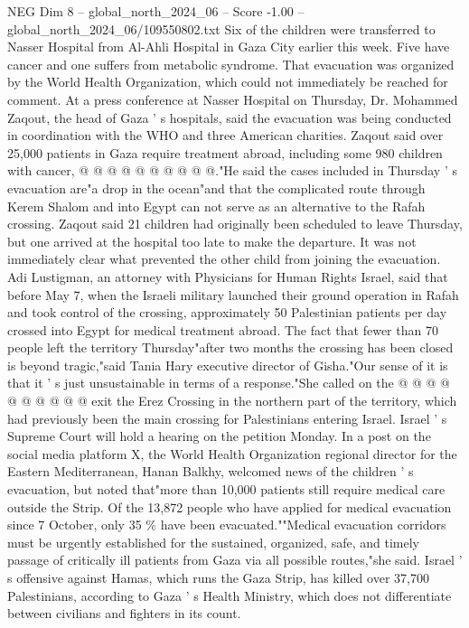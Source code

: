 \begin{textsample}{NEG Dim 8 – global\_north\_2024\_06 – Score -1.00 – global\_north\_2024\_06/109550802.txt}
Six of the children were transferred to Nasser Hospital from Al-Ahli Hospital in Gaza City earlier this week.
Five have cancer and one suffers from metabolic syndrome.
That evacuation was organized by the World Health Organization, which could not immediately be reached for comment.
At a press conference at Nasser Hospital on Thursday, Dr.
Mohammed Zaqout, the head of Gaza ' s hospitals, said the evacuation was being conducted in coordination with the WHO and three American charities.
Zaqout said over 25,000 patients in Gaza require treatment abroad, including some 980 children with cancer, @ @ @ @ @ @ @ @ @ @."He said the cases included in Thursday ' s evacuation are"a drop in the ocean"and that the complicated route through Kerem Shalom and into Egypt can not serve as an alternative to the Rafah crossing.
Zaqout said 21 children had originally been scheduled to leave Thursday, but one arrived at the hospital too late to make the departure.
It was not immediately clear what prevented the other child from joining the evacuation.
Adi Lustigman, an attorney with Physicians for Human Rights Israel, said that before May 7, when the Israeli military launched their ground operation in Rafah and took control of the crossing, approximately 50 Palestinian patients per day crossed into Egypt for medical treatment abroad.
The fact that fewer than 70 people left the territory Thursday"after two months the crossing has been closed is beyond tragic,"said Tania Hary executive director of Gisha."Our sense of it is that it ' s just unsustainable in terms of a response."She called on the @ @ @ @ @ @ @ @ @ @ exit the Erez Crossing in the northern part of the territory, which had previously been the main crossing for Palestinians entering Israel.
Israel ' s Supreme Court will hold a hearing on the petition Monday.
In a post on the social media platform X, the World Health Organization regional director for the Eastern Mediterranean, Hanan Balkhy, welcomed news of the children ' s evacuation, but noted that"more than 10,000 patients still require medical care outside the Strip.
Of the 13,872 people who have applied for medical evacuation since 7 October, only 35 \% have been evacuated.""Medical evacuation corridors must be urgently established for the sustained, organized, safe, and timely passage of critically ill patients from Gaza via all possible routes,"she said.
Israel ' s offensive against Hamas, which runs the Gaza Strip, has killed over 37,700 Palestinians, according to Gaza ' s Health Ministry, which does not differentiate between civilians and fighters in its count.

\end{textsample}

